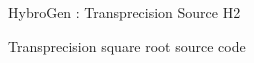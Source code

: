 \begin{Frame}{HybroGen : Transprecision Source H2}

  \begin{block}{Transprecision square root source code}
    
  \end{block}

\end{Frame}
